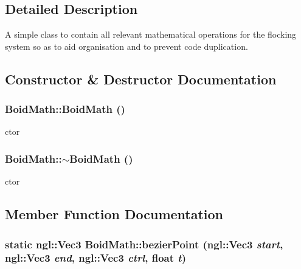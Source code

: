 \subsection{Detailed Description}
A simple class to contain all relevant mathematical operations for the flocking system so as to aid organisation and to prevent code duplication. 

\subsection{Constructor \& Destructor Documentation}
\hypertarget{classBoidMath_a96f701b19a18f2a07372f5eb50548e99}{
\subsubsection[{BoidMath}]{\setlength{\rightskip}{0pt plus 5cm}BoidMath::BoidMath ()}}
\label{classBoidMath_a96f701b19a18f2a07372f5eb50548e99}


ctor \hypertarget{classBoidMath_a1b7dfa1c968c08d4ed9ba03be75d91e0}{
\subsubsection[{$\sim$BoidMath}]{\setlength{\rightskip}{0pt plus 5cm}BoidMath::$\sim$BoidMath ()}}
\label{classBoidMath_a1b7dfa1c968c08d4ed9ba03be75d91e0}


ctor 

\subsection{Member Function Documentation}
\hypertarget{classBoidMath_a5d79930301768c78ba68963bd13e263d}{
\subsubsection[{bezierPoint}]{\setlength{\rightskip}{0pt plus 5cm}static ngl::Vec3 BoidMath::bezierPoint (ngl::Vec3 {\em start}, \/  ngl::Vec3 {\em end}, \/  ngl::Vec3 {\em ctrl}, \/  float {\em t})}}
\label{classBoidMath_a5d79930301768c78ba68963bd13e263d}


